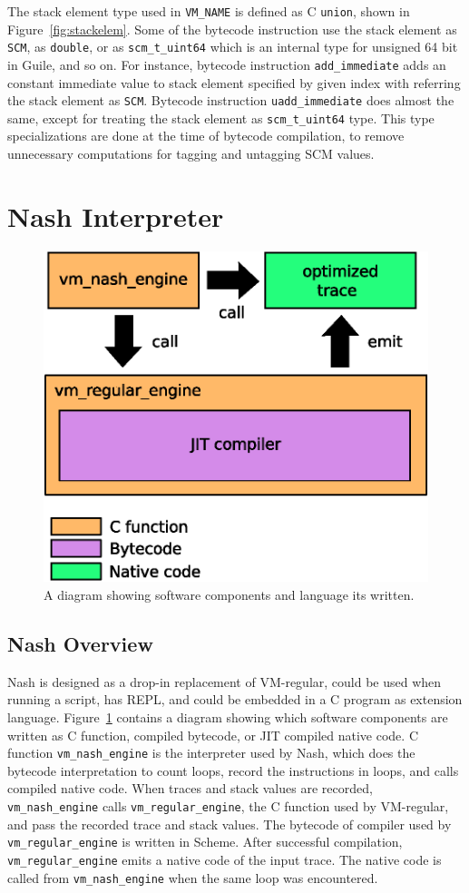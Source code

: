 \documentclass[preprint]{sigplanconf}
\begin{document}
The stack element type used in \texttt{VM\_NAME} is defined as C \texttt{union},
shown in Figure~\hyperref[fig:stackelem]{\ref{fig:stackelem}}. Some of the
bytecode instruction use the stack element as \texttt{SCM}, as \texttt{double},
or as \texttt{scm\_t\_uint64} which is an internal type for unsigned 64 bit in
Guile, and so on. For instance, bytecode instruction \texttt{add\_immediate}
adds an constant immediate value to stack element specified by given index with
referring the stack element as \texttt{SCM}. Bytecode instruction
\texttt{uadd\_immediate} does almost the same, except for treating the stack
element as \texttt{scm\_t\_uint64} type. This type specializations are done at
the time of bytecode compilation, to remove unnecessary computations for tagging
and untagging SCM values.

\section{Nash Interpreter}
\label{sec:interpreter}

\begin{figure}
  \begin{center}
    \includegraphics[width=0.4 \textwidth]{overview}
    \caption{A diagram showing software components and language its written.}
  \end{center}
\label{fig:overview}
\end{figure}

\subsection{Nash Overview}

Nash is designed as a drop-in replacement of VM-regular, could be used when
running a script, has REPL, and could be embedded in a C program as extension
language. Figure~\hyperref[fig:overview]{\ref{fig:overview}} contains a diagram
showing which software components are written as C function, compiled bytecode,
or JIT compiled native code. C function \texttt{vm\_nash\_engine} is the
interpreter used by Nash, which does the bytecode interpretation to count loops,
record the instructions in loops, and calls compiled native code. When traces
and stack values are recorded, \texttt{vm\_nash\_engine} calls
\texttt{vm\_regular\_engine}, the C function used by VM-regular, and pass the
recorded trace and stack values. The bytecode of compiler used by
\texttt{vm\_regular\_engine} is written in Scheme. After successful compilation,
\texttt{vm\_regular\_engine} emits a native code of the input trace. The native
code is called from \texttt{vm\_nash\_engine} when the same loop was
encountered.
\end{document}
